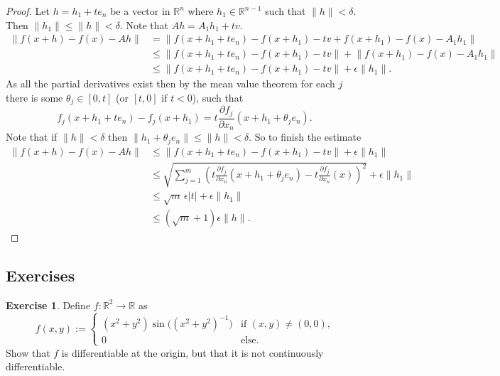 \documentclass[12pt]{book}
\newcommand{\snorm}[1]{\lVert {#1} \rVert}
\newcommand{\abs}[1]{\left\lvert {#1} \right\rvert}
\newcommand{\R}{{\mathbb{R}}}
\theoremstyle{plain}
\theoremstyle{remark}
\theoremstyle{definition}
\theoremstyle{exercise}
\newtheorem{exercise}{Exercise}[section]
\theoremstyle{example}
\begin{document}
\begin{proof}
Let $h = h_1 + t e_n$ be a vector in $\R^n$ where $h_1 \in \R^{n-1}$ such that
$\snorm{h} < \delta$.  Then $\snorm{h_1} \leq \snorm{h} < \delta$.
Note that $Ah = A_1h_1 + tv$.
\begin{equation*}
\begin{split}
\snorm{f(x+h) - f(x) - Ah}
& = \snorm{f(x+h_1 + t e_n) - f(x+h_1) - tv + f(x+h_1) - f(x) - A_1h_1}
\\
& \leq \snorm{f(x+h_1 + t e_n) - f(x+h_1) -tv} + \snorm{f(x+h_1) - f(x) -
A_1h_1}
\\
& \leq \snorm{f(x+h_1 + t e_n) - f(x+h_1) -tv} + \epsilon \snorm{h_1} .
\end{split}
\end{equation*}
As all the partial derivatives exist then by the mean value theorem
for each $j$ there is some $\theta_j \in [0,t]$ (or $[t,0]$ if $t < 0$), such that
\begin{equation*}
f_j(x+h_1 + t e_n) - f_j(x+h_1) =
t \frac{\partial f_j}{\partial x_n}(x+h_1+\theta_j e_n).
\end{equation*}
Note that if $\snorm{h} < \delta$ then $\snorm{h_1+\theta_j e_n} \leq \snorm{h}
< \delta$.
So to finish the estimate
\begin{equation*}
\begin{split}
\snorm{f(x+h) - f(x) - Ah}
& \leq \snorm{f(x+h_1 + t e_n) - f(x+h_1) -tv} + \epsilon \snorm{h_1}
\\
& \leq \sqrt{\sum_{j=1}^m {\left(t\frac{\partial f_j}{\partial
x_n}(x+h_1+\theta_j e_n) -
t \frac{\partial f_j}{\partial x_n}(x)\right)}^2} + \epsilon \snorm{h_1}
\\
& \leq \sqrt{m}\, \epsilon \abs{t} + \epsilon \snorm{h_1}
\\
& \leq (\sqrt{m}+1)\epsilon \snorm{h} .
\end{split}
\end{equation*}
\end{proof}

\subsection{Exercises}

\begin{exercise}
Define $f \colon \R^2 \to \R$ as
\begin{equation*}
f(x,y) :=
\begin{cases}
(x^2+y^2)\sin\bigl({(x^2+y^2)}^{-1}\bigr) & \text{if $(x,y)
\not= (0,0)$,} \\
0 & \text{else.}
\end{cases}
\end{equation*}
Show that $f$ is differentiable at the origin, but that it is not 
continuously differentiable.
\end{exercise}
\end{document}

